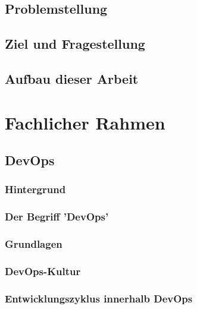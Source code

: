 \documentclass[12pt,titlepage]{article}
\begin{document}
\subsection{Problemstellung}


\subsection{Ziel und Fragestellung}


\subsection{Aufbau dieser Arbeit}



\section{Fachlicher Rahmen}


\subsection{DevOps}


\subsubsection{Hintergrund}


\subsubsection{Der Begriff 'DevOps'}


\subsubsection{Grundlagen}


\subsubsection{DevOps-Kultur}


\subsubsection{Entwicklungszyklus innerhalb DevOps}

\end{document}
